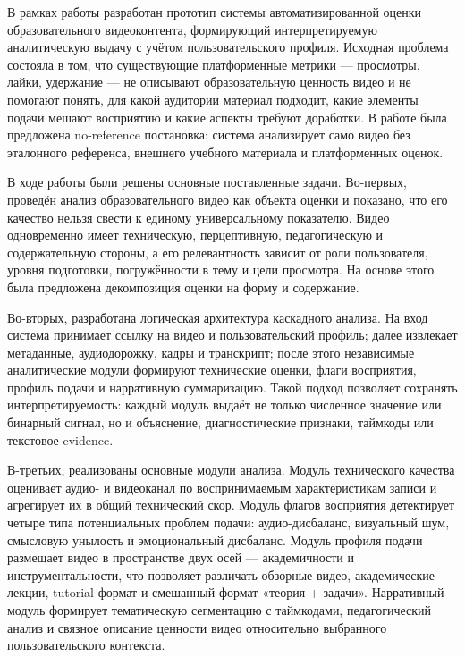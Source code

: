 
В рамках работы разработан прототип системы автоматизированной оценки
образовательного видеоконтента, формирующий интерпретируемую аналитическую
выдачу с учётом пользовательского профиля. Исходная проблема состояла в том,
что существующие платформенные метрики — просмотры, лайки, удержание —
не описывают образовательную ценность видео и не помогают понять, для какой
аудитории материал подходит, какие элементы подачи мешают восприятию и какие
аспекты требуют доработки. В работе была предложена no-reference постановка:
система анализирует само видео без эталонного референса, внешнего учебного
материала и платформенных оценок.

В ходе работы были решены основные поставленные задачи. Во-первых, проведён
анализ образовательного видео как объекта оценки и показано, что его качество
нельзя свести к единому универсальному показателю. Видео одновременно имеет
техническую, перцептивную, педагогическую и содержательную стороны, а его
релевантность зависит от роли пользователя, уровня подготовки, погружённости
в тему и цели просмотра. На основе этого была предложена декомпозиция оценки
на форму и содержание.

Во-вторых, разработана логическая архитектура каскадного анализа. На вход
система принимает ссылку на видео и пользовательский профиль; далее извлекает
метаданные, аудиодорожку, кадры и транскрипт; после этого независимые
аналитические модули формируют технические оценки, флаги восприятия, профиль
подачи и нарративную суммаризацию. Такой подход позволяет сохранять
интерпретируемость: каждый модуль выдаёт не только численное значение или
бинарный сигнал, но и объяснение, диагностические признаки, таймкоды или
текстовое evidence.

В-третьих, реализованы основные модули анализа. Модуль технического качества
оценивает аудио- и видеоканал по воспринимаемым характеристикам записи и
агрегирует их в общий технический скор. Модуль флагов восприятия детектирует
четыре типа потенциальных проблем подачи: аудио-дисбаланс, визуальный шум,
смысловую унылость и эмоциональный дисбаланс. Модуль профиля подачи размещает
видео в пространстве двух осей — академичности и инструментальности, что
позволяет различать обзорные видео, академические лекции, tutorial-формат
и смешанный формат «теория + задачи». Нарративный модуль формирует
тематическую сегментацию с таймкодами, педагогический анализ и связное
описание ценности видео относительно выбранного пользовательского контекста.

